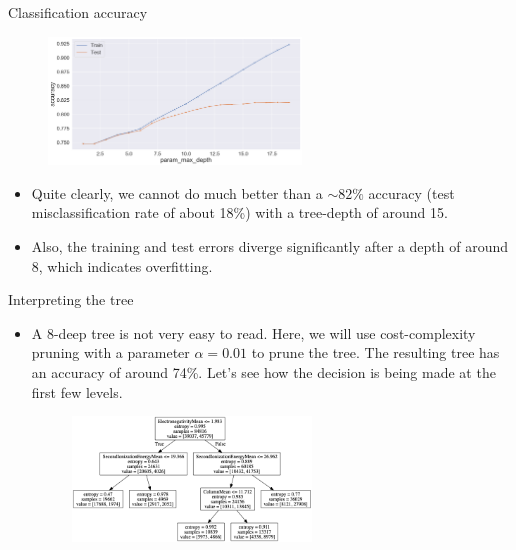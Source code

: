 \documentclass[aspectratio=169]{beamer}
\begin{document}
\begin{frame}{Classification accuracy}
    \begin{figure}
        \centering
        \includegraphics[width=0.6\textwidth]{figures/accuracy_metal_insulator.png}
    \end{figure}
    \begin{itemize}
        \item Quite clearly, we cannot do much better than a $\sim 82\%$ accuracy (test misclassification rate of about 18\%) with a tree-depth of around 15.
        \item Also, the training and test errors diverge significantly after a depth of around 8, which indicates overfitting.
    \end{itemize}
\end{frame}


\begin{frame}{Interpreting the tree}
    \begin{itemize}
        \item A 8-deep tree is not very easy to read. Here, we will use cost-complexity pruning with a parameter $\alpha = 0.01$ to prune the tree. The resulting tree has an accuracy of around 74\%. Let's see how the decision is being made at the first few levels.
        \begin{figure}
            \centering
            \includegraphics[width=0.6\textwidth]{figures/metal_insulator_tree.png}
        \end{figure}
    \end{itemize}
\end{frame}
\end{document}
